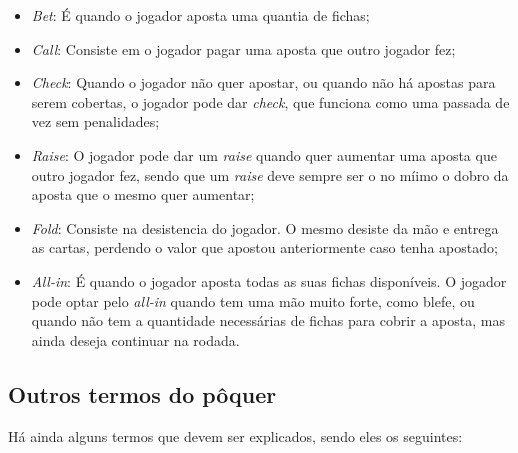 \begin{itemize}
      \item \textit{Bet}:
            É quando o jogador aposta uma quantia de fichas;

      \item \textit{Call}:
            Consiste em o jogador pagar uma aposta que outro jogador fez;

      \item \textit{Check}:
            Quando o jogador não quer apostar, ou quando não há apostas para serem cobertas, o jogador pode dar \textit{check}, que funciona como uma passada de vez sem penalidades;

      \item \textit{Raise}:
            O jogador pode dar um \textit{raise} quando quer aumentar uma aposta que outro jogador fez, sendo que um \textit{raise} deve sempre ser o no míimo o dobro da aposta que o mesmo quer aumentar;

      \item \textit{Fold}:
            Consiste na desistencia do jogador. O mesmo desiste da mão e entrega as cartas, perdendo o valor que apostou anteriormente caso tenha apostado;

      \item \textit{All-in}:
            É quando o jogador aposta todas as suas fichas disponíveis. O jogador pode optar pelo \textit{all-in} quando tem uma mão muito forte, como blefe, ou quando não tem a quantidade necessárias de fichas para cobrir a aposta, mas ainda deseja continuar na rodada.
\end{itemize}

\subsection{Outros termos do pôquer}

Há ainda alguns termos que devem ser explicados, sendo eles os seguintes:

